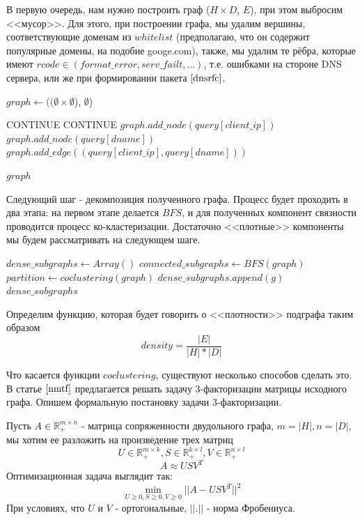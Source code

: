 \documentclass[a4paper,14pt]{extreport} %
\begin{document}
В первую очередь, нам нужно построить граф ($H \times D$, $E$), при этом выбросим <<мусор>>. Для этого, при построении графа, мы удалим вершины, соответствующие доменам из $whitelist$ (предполагаю, что он содержит популярные домены, на подобие googe.com), также, мы удалим те рёбра, которые имеют $rcode \in (format\_error, serv\_failt, ...)$, т.е. ошибками на стороне DNS сервера, или же при формировании пакета $\cite{dnsrfc}$.
\\
\begin{algorithmic}
	\State $graph \gets ((\emptyset \times \emptyset$), $\emptyset$)
			
	\State CONTINUE
	\EndIf
	\State CONTINUE
	\EndIf
	\State $graph.add\_node(query[client\_ip])$
	\State $graph.add\_node(query[dname])$
	\State $graph.add\_edge((query[client\_ip], query[dname]))$
					
	\EndFor
	\State \Return $graph$
	\EndFunction
\end{algorithmic}
	
	
Следующий шаг - декомпозиция полученного графа. Процесс будет проходить в два этапа: на первом этапе делается $BFS$, и для полученных компонент связности проводится процесс ко-кластеризации. Достаточно <<плотные>> компоненты мы будем рассматривать на следующем шаге.
\begin{algorithmic}
	\State $dense\_subgraphs\gets Array()$
	\State $connected\_subgraphs\gets BFS(graph)$
	\State $partition \gets coclustering(graph)$
	\State $dense\_subgraphs.append(g)$
	\EndIf
	\EndFor
	\EndFor
	\State \Return $dense\_subgraphs$
	\EndFunction
\end{algorithmic}
	
Определим функцию, которая будет говорить о <<плотности>> подграфа таким образом
$$density = \frac{|E|}{|H|*|D|}$$
	
Что касается функции $coclustering$, существуют несколько способов сделать это. В статье $\cite{nmtf}$ предлагается решать задачу 3-факторизации матрицы исходного графа. Опишем формальную постановку задачи 3-факторизации.
	
Пусть $A \in \mathbb{R}_{+}^{m \times n}$ - матрица сопряженности двудольного графа,  $m = |H|, n = |D|$, мы хотим ее разложить на произведение трех матриц $$ U \in \mathbb{R}_{+}^{m \times k}, S \in \mathbb{R}_{+}^{k \times l}, V \in  \mathbb{R}_{+}^{n \times l}$$
$$ A \approx USV^T$$
Оптимизационная задача выглядит так:
$$\min_{U \ge 0, S \ge 0, V \ge 0}{|| A - USV^T||^2}$$
При условиях, что  $U$ и $V$  - ортогональные, $||.||$ - норма Фробениуса.
	
\end{document}
